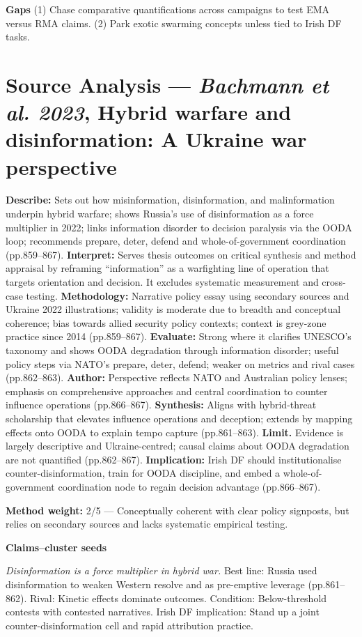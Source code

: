 \textbf{Gaps}
(1) Chase comparative quantifications across campaigns to test EMA versus RMA claims.
(2) Park exotic swarming concepts unless tied to Irish DF tasks.


\parencite{BACHMANN_2023a_OODA}
\section*{Source Analysis — \textit{Bachmann et al. 2023}, Hybrid warfare and disinformation: A Ukraine war perspective}
\textbf{Describe:} Sets out how misinformation, disinformation, and malinformation underpin hybrid warfare; shows Russia’s use of disinformation as a force multiplier in 2022; links information disorder to decision paralysis via the OODA loop; recommends prepare, deter, defend and whole-of-government coordination (pp.859–867).
\textbf{Interpret:} Serves thesis outcomes on critical synthesis and method appraisal by reframing “information” as a warfighting line of operation that targets orientation and decision. It excludes systematic measurement and cross-case testing.
\textbf{Methodology:} Narrative policy essay using secondary sources and Ukraine 2022 illustrations; validity is moderate due to breadth and conceptual coherence; bias towards allied security policy contexts; context is grey-zone practice since 2014 (pp.859–867).
\textbf{Evaluate:} Strong where it clarifies UNESCO’s taxonomy and shows OODA degradation through information disorder; useful policy steps via NATO’s prepare, deter, defend; weaker on metrics and rival cases (pp.862–863).
\textbf{Author:} Perspective reflects NATO and Australian policy lenses; emphasis on comprehensive approaches and central coordination to counter influence operations (pp.866–867).
\textbf{Synthesis:} Aligns with hybrid-threat scholarship that elevates influence operations and deception; extends by mapping effects onto OODA to explain tempo capture (pp.861–863).
\textbf{Limit.} Evidence is largely descriptive and Ukraine-centred; causal claims about OODA degradation are not quantified (pp.862–867).
\textbf{Implication:} Irish DF should institutionalise counter-disinformation, train for OODA discipline, and embed a whole-of-government coordination node to regain decision advantage (pp.866–867).

\textbf{Method weight:} 2/5 — Conceptually coherent with clear policy signposts, but relies on secondary sources and lacks systematic empirical testing.

\textbf{Claims–cluster seeds}

\textit{Disinformation is a force multiplier in hybrid war.} Best line: Russia used disinformation to weaken Western resolve and as pre-emptive leverage (pp.861–862). Rival: Kinetic effects dominate outcomes. Condition: Below-threshold contests with contested narratives. Irish DF implication: Stand up a joint counter-disinformation cell and rapid attribution practice.

